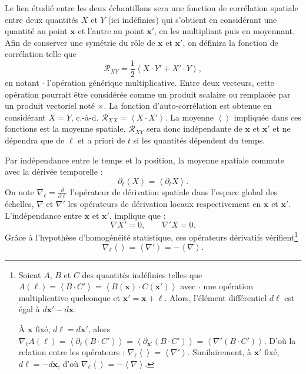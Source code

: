 Le lien étudié entre les deux échantillons sera une fonction de corrélation spatiale entre deux quantités $X$ et $Y$ (ici indéfinies) qui s'obtient en considérant une quantité au point $\mathbf{x}$ et l'autre au point $\mathbf{x'}$, en les multipliant puis en moyennant. Afin de conserver une symétrie du rôle de $\mathbf{x}$ et $\mathbf{x'}$, on définira la fonction de corrélation telle que 
\begin{equation}
    \label{eq:def_correlation} \mathcal{R}_{XY} = \frac{1}{2} \left<X \cdot Y' + X' \cdot Y\right>,
\end{equation}
en notant $\cdot$ l'opération générique multiplicative. Entre deux vecteurs, cette opération pourrait être considérée comme un produit scalaire ou remplacée par un produit vectoriel noté $\times$. La fonction d'auto-corrélation est obtenue en considérant $X=Y$, c.-à-d. $\mathcal{R}_{XX} = \left<X \cdot X'\right>$. 
La moyenne $\left<\right>$ impliquée dans ces fonctions est la moyenne spatiale. $\mathcal{R}_{XY}$ sera donc indépendante de $\mathbf{x}$ et $\mathbf{x'}$ et ne dépendra que de $\boldsymbol{\ell}$ et a priori de $t$ si les quantités dépendent du temps. 

Par indépendance entre le temps et la position, la moyenne spatiale commute avec la dérivée temporelle : 
\begin{equation}
  \label{eq:prop_t}  \partial_t \left<X\right> = \left<\partial_t X\right> .
\end{equation}
On note  $\nabla_{\boldsymbol{\ell}} = \frac{\partial}{\partial \boldsymbol{\ell}}$ l'opérateur de dérivation spatiale dans l'espace global des échelles, $\nabla$ et $\nabla'$ les opérateurs de dérivation locaux respectivement en $\mathbf{x}$ et $\mathbf{x'}$. L'indépendance entre $\mathbf{x}$ et $\mathbf{x'}$, implique que :
\begin{equation}
  \label{eq:prop_x}    \nabla X' = 0,  \qquad \nabla' X = 0.
\end{equation}
Grâce à l'hypothèse d'homogénéité statistique, ces opérateurs dérivatifs vérifient\footnote{
Soient $A$, $B$ et $C$ des quantités indéfinies telles que $A(\boldsymbol{\ell}) = \left<B \cdot C'\right> = \left<B(\mathbf{x}) \cdot C(\mathbf{x'})\right>$  avec $\cdot$ une opération multiplicative quelconque et $\mathbf{x'} = \mathbf{x} + \boldsymbol{\ell}$. Alors, l'élément différentiel $d \boldsymbol{\ell} $ est égal à $d \mathbf{x'} - d \mathbf{x}$. 

À $\mathbf{x}$ fixé, $ d \boldsymbol{\ell} = d \mathbf{x'}$, alors
$\nabla_{\boldsymbol{\ell}} A(\boldsymbol{\ell}) = \left<\partial_{\boldsymbol{\ell}} (B \cdot  C')\right> = \left<\partial_{\mathbf{x'}} (B \cdot  C') \right> = \left<\nabla' (B \cdot  C')\right> $. D'où la relation entre les opérateurs :  $\nabla_{\boldsymbol{\ell}} \left<\right> = \left<\nabla'\right>$. Similairement, à $\mathbf{x'}$ fixé, $ d \boldsymbol{\ell} = - d \mathbf{x}$, d'où $\nabla_{\boldsymbol{\ell}} \left<\right> = - \left<\nabla\right>$.
}
\begin{equation}
   \label{eq:prop_l}   \nabla_{\boldsymbol{\ell}}\left<\right> = \left<\nabla' \right> = - \left<\nabla \right> .
\end{equation}

